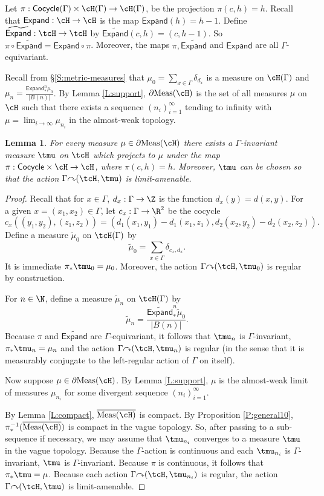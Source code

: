\documentclass[12pt]{article}
\theoremstyle{plain}
\newtheorem{lem}[thm]{Lemma}
\theoremstyle{definition}
\theoremstyle{remark}
\newcommand{\G}{\Gamma}
\renewcommand\d{\delta}
\newcommand{\Add}{\mathsf{Expand}}
\newcommand\Cocycle{\mathsf{Cocycle}}
\newcommand\Expand{{\mathsf{Expand}}}
\newcommand\Meas{{\operatorname{Meas}}}
\def\cc{{\curvearrowright}}
\begin{document}
Let $\pi:\Cocycle(\G)\times \cH(\G) \to \cH(\G)$, be the projection $\pi(c,h)=h$. Recall that $\Expand:\cH \to \cH$ is the map $\Expand(h)=h-1$. Define $\widetilde{\Expand}:\tcH \to \tcH$ by $\widetilde{\Expand}(c,h)=(c,h-1)$. So $\pi \circ \widetilde{\Expand}=\Expand \circ \pi$. Moreover, the maps $\pi, \widetilde{\Expand}$ and $\Expand$ are all $\G$-equivariant.

Recall from \S \ref{S:metric-measures} that $\mu_{0} = \sum_{x\in \G} \d_{d_x}$ is a measure on $\cH(\G)$ and $\mu_{n} = \frac{\Add^n_{*}\mu_{0}}{|B(n)|}$. By Lemma \ref{L:support}, $\partial\Meas(\cH)$ is the set of all measures $\mu$ on $\cH$ such that there exists a sequence $(n_i)_{i=1}^\infty$ tending to infinity with $\mu = \lim_{i\to\infty} \mu_{n_i}$ in the almost-weak topology.

\begin{lem}\label{L:existence-1}
For every measure $\mu \in \partial\Meas(\cH)$ there exists a $\G$-invariant measure $\tmu$ on $\tcH$ which projects to $\mu$ under the map $\pi:\Cocycle \times \cH \to \cH$, where $\pi(c,h)=h$. Moreover, $\tmu$ can be chosen so that the action $\G \cc (\tcH,\tmu)$ is limit-amenable.
\end{lem}

\begin{proof}
    Recall that for $x\in \G$, $d_x:\G \to \Z$ is the function $d_x(y)=d(x,y)$. For a given $x=(x_1,x_2) \in \G$, let $c_x:\G\to \R^2$ be the cocycle
$$c_x( (y_1,y_2), (z_1,z_2)) = (d_1(x_1,y_1)-d_1(x_1,z_1), d_2(x_2,y_2)-d_2(x_2,z_2)).$$
Define a measure $\tilde{\mu}_0$ on $\tcH(\G)$ by 
$$\tilde{\mu}_0 = \sum_{x\in \G} \d_{c_x,d_x}.$$
It is immediate $\pi_*\tmu_0=\mu_0$. Moreover, the action $\G \cc (\tcH,\tmu_0)$ is regular by construction. 

For $n\in \N$, define a measure $\tilde{\mu}_n$ on $\tcH(\G)$ by 
$$\tilde{\mu}_n = \frac{\widetilde{\Expand}^n_*\tilde{\mu}_0}{|B(n)|}.$$ 
Because $\pi$ and $\widetilde{\Expand}$ are $\G$-equivariant, it follows that $\tmu_n$ is $\G$-invariant, $\pi_*\tmu_n=\mu_n$ and the action $\G \cc (\tcH,\tmu_n)$ is regular (in the sense that it is measurably conjugate to the left-regular action of $\G$ on itself).

Now suppose $\mu \in \partial\Meas(\cH)$. By Lemma \ref{L:support}, $\mu$ is the almost-weak limit of measures $\mu_{n_i}$ for some divergent sequence $(n_i)_{i=1}^\infty$. 

By Lemma \ref{L:compact}, $\overline{\Meas(\cH)}$ is compact. By Proposition \ref{P:general10}, $\pi^{-1}_*(\overline{\Meas(\cH)})$ is compact in the vague topology. So, after passing to a sub-sequence if necessary, we may assume that $\tmu_{n_i}$ converges to a measure $\tmu$ in the vague topology. Because the $\G$-action is continuous and each $\tmu_{n_i}$ is $\G$-invariant, $\tmu$ is $\G$-invariant. Because $\pi$ is continuous, it follows that $\pi_*\tmu=\mu$. Because each action $\G \cc (\tcH, \tmu_{n_i})$ is regular, the action $\G \cc (\tcH, \tmu)$ is limit-amenable. 
\end{proof}
\end{document}
